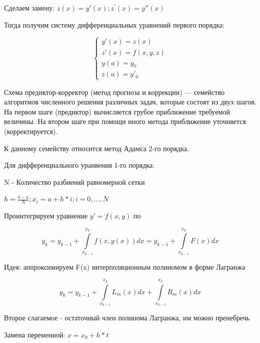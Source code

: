 Сделаем замену: 
\begin{math}
	z(x)=y'(x); z^{'}(x)=y''(x)
\end{math}

Тогда получим систему дифференциальных уравнений первого порядка: 

\begin{equation}
	\begin{cases}
		y'(x)=z(x) \\
		z'(x)=f(x,y,z) \\
		y(a) = y_{0} \\
		z(a) = y'_{0}
	\end{cases}
\end{equation}

Схема предиктор-корректор (метод прогноза и коррекции) — семейство алгоритмов численного решения различных задач, которые состоят из двух шагов. На первом шаге (предиктор) вычисляется грубое приближение требуемой величины. На втором шаге при помощи иного метода приближение уточняется (корректируется).

К данному семейству относится метод Адамса 2-го порядка.

Для дифференциального уранвения 1-го порядка: 

N - Количество разбиений равномерной сетки

\begin{math}
	h = \frac{b-a}{N}; x_{i}=a+h*i; i=0,...,N
\end{math}

Проинтегрируем уравнение \begin{math}
  y'=f(x,y) 
\end{math} по \begin{math}
 [x_{k-1},x_{k}]
\end{math}

\begin{equation}
	y_{k}=y_{k-1}+\int\limits_{x_{k-1}}^{x_{k}}f(x,y(x))dx=y_{k-1}+\int\limits_{x_{k-1}}^{x_{k}}F(x)dx
\end{equation}

Идея: аппроксимируем F(x) интерполяционным полиномом в форме Лагранжа

\begin{equation}
	y_{k}=y_{k-1}+\int\limits_{x_{k-1}}^{x_{k}}L_{m}(x)dx+\int\limits_{x_{k-1}}^{x_{k}}R_{m}(x)dx
\end{equation}

 Второе слагаемое - остаточный член полинома Лагранжа, им можно пренебречь
 
 Замена переменной: \begin{math}
 	x=x_{0}+h*t
 \end{math}

